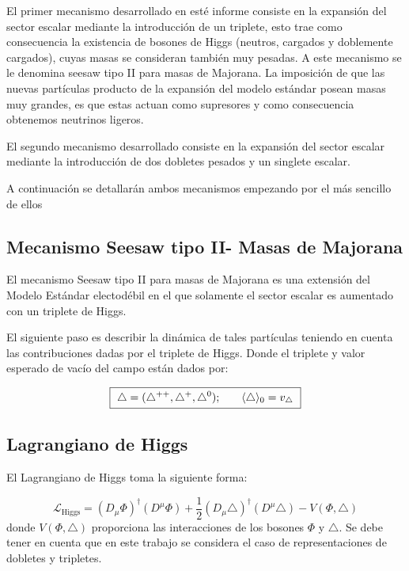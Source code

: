 \documentclass[12pt]{article}
\begin{document}
El primer mecanismo desarrollado en esté informe consiste  en la expansión del sector escalar mediante la introducción de un triplete, esto trae como consecuencia la existencia de bosones de Higgs (neutros, cargados y doblemente cargados), cuyas masas se consideran también muy pesadas. A este mecanismo se le denomina seesaw tipo II para masas de Majorana. La imposición de que las nuevas partículas producto de la expansión del modelo estándar posean masas muy grandes, es que estas actuan como supresores y como consecuencia obtenemos neutrinos ligeros.

El segundo mecanismo desarrollado consiste en la expansión del sector escalar mediante la introducción de dos dobletes pesados y un singlete escalar.

A continuación se detallarán ambos mecanismos empezando por el más sencillo de ellos


\subsection{Mecanismo Seesaw tipo II- Masas de Majorana}

El mecanismo Seesaw tipo II para masas de Majorana es una extensión del Modelo Estándar electodébil en el que solamente el sector escalar es aumentado con un triplete de Higgs.

El siguiente paso es describir la dinámica de tales partículas teniendo en cuenta las contribuciones dadas por el triplete de Higgs. Donde el  triplete y valor esperado de vacío del campo están dados por: 


\begin{equation}
\fbox{ $\begin{aligned}
     \triangle= (\triangle^{++},  \triangle^{+},    \triangle^{0}) ;\qquad &  \langle  \triangle \rangle_0 = v_\triangle \\
\end{aligned} $  }
\label{eq:11}
\end{equation} 


\subsection{Lagrangiano de Higgs}
El Lagrangiano de Higgs toma la siguiente forma: 

\begin{equation}
    \mathcal{L}_{\text{Higgs}}= (D_\mu\Phi)^\dagger(D^\mu\Phi)+ \frac{1}{2}(D_\mu\triangle)^\dagger(D^\mu\triangle) - V(\Phi, \triangle)
    \label{eq:Higgs}
\end{equation}
donde $ V(\Phi, \triangle)$  proporciona las interacciones de los bosones \(\Phi\) y \(\triangle\). 
 Se debe tener en cuenta que en este trabajo se considera el caso de representaciones de dobletes y tripletes. 
 
\end{document}
